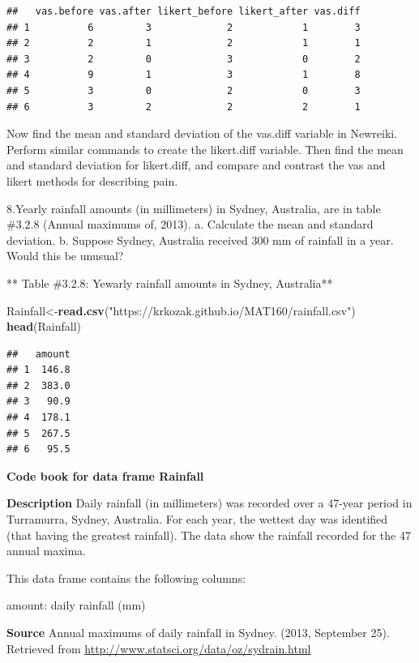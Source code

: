 \documentclass[]{book}
\newenvironment{Shaded}{\begin{snugshade}}{\end{snugshade}}
\newcommand{\KeywordTok}[1]{\textcolor[rgb]{0.13,0.29,0.53}{\textbf{#1}}}
\newcommand{\NormalTok}[1]{#1}
\newcommand{\StringTok}[1]{\textcolor[rgb]{0.31,0.60,0.02}{#1}}
\begin{document}
\begin{verbatim}
##   vas.before vas.after likert_before likert_after vas.diff
## 1          6         3             2            1        3
## 2          2         1             2            1        1
## 3          2         0             3            0        2
## 4          9         1             3            1        8
## 5          3         0             2            0        3
## 6          3         2             2            2        1
\end{verbatim}

Now find the mean and standard deviation of the vas.diff variable in Newreiki. Perform similar commands to create the likert.diff variable. Then find the mean and standard deviation for likert.diff, and compare and contrast the vas and likert methods for describing pain.

8.Yearly rainfall amounts (in millimeters) in Sydney, Australia, are in table \#3.2.8
(Annual maximums of, 2013).
a. Calculate the mean and standard deviation.
b. Suppose Sydney, Australia received 300 mm of rainfall in a year. Would this be unusual?

** Table \#3.2.8: Yewarly rainfall amounts in Sydney, Australia**

\begin{Shaded}
\begin{Highlighting}[]
\NormalTok{Rainfall<-}\KeywordTok{read.csv}\NormalTok{(}\StringTok{"https://krkozak.github.io/MAT160/rainfall.csv"}\NormalTok{)}
\KeywordTok{head}\NormalTok{(Rainfall)}
\end{Highlighting}
\end{Shaded}

\begin{verbatim}
##   amount
## 1  146.8
## 2  383.0
## 3   90.9
## 4  178.1
## 5  267.5
## 6   95.5
\end{verbatim}

\textbf{Code book for data frame Rainfall}

\textbf{Description}
Daily rainfall (in millimeters) was recorded over a 47-year period in Turramurra, Sydney, Australia. For each year, the wettest day was identified (that having the greatest rainfall). The data show the rainfall recorded for the 47 annual maxima.

This data frame contains the following columns:

amount: daily rainfall (mm)

\textbf{Source}
Annual maximums of daily rainfall in Sydney. (2013, September 25). Retrieved from
\url{http://www.statsci.org/data/oz/sydrain.html}
\end{document}
